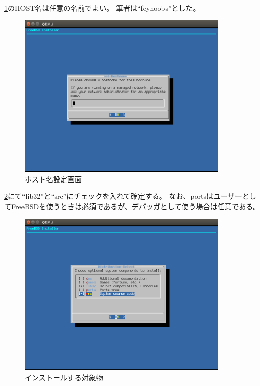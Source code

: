\documentclass[a4j]{jarticle}
\begin{document}
\ref{fig:FreeBSD_HOST}のHOST名は任意の名前でよい。
筆者は``feynoobs''とした。
\begin{figure}[htbp]
	\begin{center}
    	\includegraphics[width=10cm]{./IMG/FreeBSD_HOST.png}
	\end{center}
    \caption{ホスト名設定画面}
    \label{fig:FreeBSD_HOST}
\end{figure}

\ref{fig:FreeBSD_INST_SELECT}にて``lib32''と``src''にチェックを入れて確定する。
なお、portsはユーザーとしてFreeBSDを使うときは必須であるが、デバッガとして使う場合は任意である。
\begin{figure}[htbp]
	\begin{center}
    	\includegraphics[width=10cm]{./IMG/FreeBSD_INST.png}
	\end{center}
    \caption{インストールする対象物}
    \label{fig:FreeBSD_INST_SELECT}
\end{figure}
\end{document}
